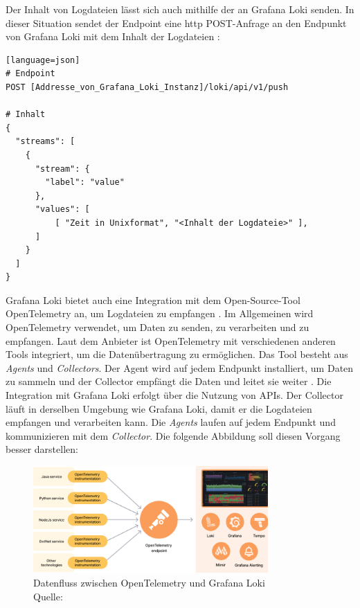 Der Inhalt von Logdateien lässt sich auch mithilfe der \textbf{} an Grafana Loki senden. In dieser Situation sendet der \gls{Endpoint} eine \gls{http} POST-Anfrage an den Endpunkt von Grafana Loki mit dem Inhalt der Logdateien \citep{Grafana_api}:

{
\begin{lstlisting}[frame=single][language=json]
# Endpoint 
POST [Addresse_von_Grafana_Loki_Instanz]/loki/api/v1/push

# Inhalt
{
  "streams": [
    {
      "stream": {
        "label": "value"
      },
      "values": [
          [ "Zeit in Unixformat", "<Inhalt der Logdateie>" ],
      ]
    }
  ]
}
\end{lstlisting}
}

Grafana Loki bietet auch eine Integration mit dem Open-Source-Tool OpenTelemetry an, um Logdateien zu empfangen \citep{Grafana_opentelemetry}. Im Allgemeinen wird OpenTelemetry verwendet, um Daten zu senden, zu verarbeiten und zu empfangen. Laut dem Anbieter ist OpenTelemetry mit verschiedenen anderen Tools integriert, um die Datenübertragung zu ermöglichen. Das Tool besteht aus \textit{Agents} und \textit{Collectors}. Der Agent wird auf jedem Endpunkt installiert, um Daten zu sammeln und der Collector empfängt die Daten und leitet sie weiter \citep{Grafana_opentelemetry}. Die Integration mit Grafana Loki erfolgt über die Nutzung von APIs. Der Collector läuft in derselben Umgebung wie Grafana Loki, damit er die Logdateien empfangen und verarbeiten kann. Die \textit{Agents} laufen auf jedem Endpunkt und kommunizieren mit dem \textit{Collector}. Die folgende Abbildung soll diesen Vorgang besser darstellen:

\begin{figure}[H]
   \centering
   \includegraphics[width=0.8\textwidth]{assets/Grafana_OpenTelemtry.png}
   \caption[Datenfluss zwischen OpenTelemetry und Grafana Loki]
   {Datenfluss zwischen OpenTelemetry und Grafana Loki\\Quelle: \citep{Grafana_WhatOpentelemetry}}
   \centering
\end{figure}

